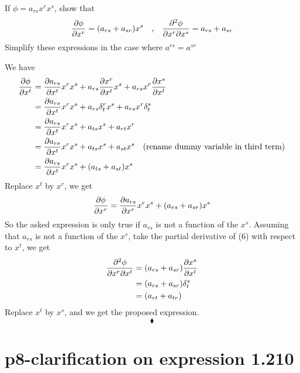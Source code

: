\begin{tcolorbox}
If $\phi = a_{rs}x^rx^s$, show that
$$\pdv{\phi}{x^{r}} = (a_{rs}+a_{sr})x^s \quad\text{,}\quad\pdv{\phi}{x^{r}}{x^{s}} = a_{rs}+a_{sr}$$
Simplify these expressions in the case where $a^{rs} = a^{sr}$
\end{tcolorbox}
We have 
\begin{align} 
\pdv{\phi}{x^{t}} &= \pdv{a_{rs}}{x^{t}}x^{r}x^{s}+a_{rs}\pdv{x^{r}}{x^{t}}x^{s}+a_{rs}x^{r}\pdv{x^{s}}{x^{t}}\\
&= \pdv{a_{rs}}{x^{t}}x^{r}x^{s}+a_{rs}\delta_t^rx^{s}+a_{rs}x^{r}\delta^s_t\\
&= \pdv{a_{rs}}{x^{t}}x^{r}x^{s}+a_{ts}x^{s}+a_{rt}x^{r}\\
&= \pdv{a_{rs}}{x^{t}}x^{r}x^{s}+a_{ts}x^{s}+a_{st}x^{s}\quad\text{(rename dummy variable in third term)}\\
&= \pdv{a_{rs}}{x^{t}}x^{r}x^{s}+(a_{ts}+a_{st})x^{s}
\end{align}
Replace $x^t$ by $x^r$, we get
\begin{align}
\pdv{\phi}{x^{r}}  =\pdv{a_{rs}}{x^{r}}x^{r}x^{s}+(a_{rs}+a_{sr})x^{s}
\end{align}
So the asked expression is only true if $a_{rs}$ is not a function of the $x^{s}$.
Assuming that $a_{rs}$ is not a function of the $x^{s}$, take the partial derivative of (6) with respect to $x^{t}$, we get
\begin{align} 
\pdv{\phi}{x^{r}}{x^{t}} &= (a_{rs}+a_{sr})\pdv{x^{s}}{x^{t}}\\
&=(a_{rs}+a_{sr})\delta^{s}_{t}\\
&=(a_{rt}+a_{tr})
\end{align}
Replace $x^t$ by $x^s$, and we get the proposed expression.
$$\blacklozenge$$
\pagebreak[4]

\section{p8-clarification on expression 1.210}

